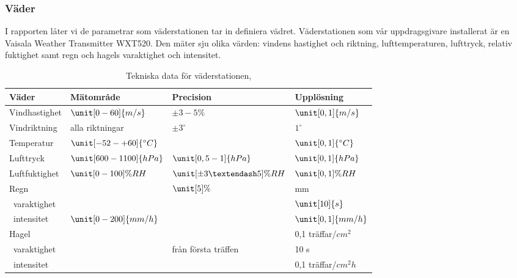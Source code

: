 \subsubsection{Väder}
I rapporten låter vi de parametrar som väderstationen tar in definiera vädret. Väderstationen som vår uppdragsgivare installerat är en Vaisala Weather Transmitter WXT520. Den mäter sju olika värden: vindens hastighet och riktning, lufttemperaturen, lufttryck, relativ fuktighet samt regn och hagels varaktighet och intensitet.

\begin{table}[htdp]
\caption{Tekniska data för väderstationen, \cite{datablad_weathertransmitter}}
\begin{center}
\begin{tabular}{|l | l l l|}
\hline
\textbf{Väder} & \textbf{Mätområde} %
 & \textbf{Precision} %
 & \textbf{Upplösning} \\ %
\hline
\rule{0pt}{3ex}Vindhastighet & $\unit[0-60]{m/s}$ & $\pm 3-5\%$ & $\unit[0,1]{m/s}$ \\ 
\rule{0pt}{3ex}Vindriktning & alla riktningar & $\pm 3^{\circ}$ & $1^{\circ}$ \\
\rule{0pt}{3ex}Temperatur & $\unit[-52-+60]{^{\circ}C}$ & & $\unit[0,1]{^{\circ}C}$ \\
\rule{0pt}{3ex}Lufttryck & $\unit[600-1100]{hPa}$ & $\unit[0,5-1]{hPa}$ & $\unit[0,1]{hPa}$ \\
\rule{0pt}{3ex}Luftfuktighet & $\unit[0-100]{\%RH}$ & $\unit[\pm3–5]{\%RH}$ & $\unit[0,1]{\%RH}$ \\
\rule{0pt}{3ex}Regn &  & $\unit[5]{\%}$ & \unit[0,01]{mm} \\
~varaktighet & & & $\unit[10]{s}$\\
~intensitet & $\unit[0-200]{mm/h}$ & & $\unit[0,1]{mm/h}$ \\
\rule{0pt}{3ex}Hagel &  &  & 0,1 träffar/$\unit{cm^2}$ \\
~varaktighet & & från första träffen & 10 s\\
~intensitet & & & 0,1 träffar/$\unit{cm^2h}$\\
\hline
\end{tabular}
\end{center}
\label{default}
\end{table}
